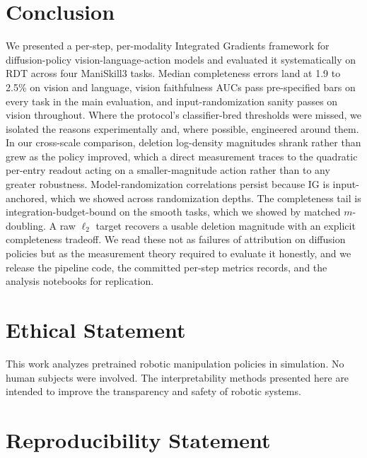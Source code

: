 \documentclass{article}
\begin{document}
\section{Conclusion}

We presented a per-step, per-modality Integrated Gradients framework for diffusion-policy vision-language-action models and evaluated it systematically on RDT across four ManiSkill3 tasks.
Median completeness errors land at 1.9 to 2.5\% on vision and language, vision faithfulness AUCs pass pre-specified bars on every task in the main evaluation, and input-randomization sanity passes on vision throughout.
Where the protocol's classifier-bred thresholds were missed, we isolated the reasons experimentally and, where possible, engineered around them.
In our cross-scale comparison, deletion log-density magnitudes shrank rather than grew as the policy improved, which a direct measurement traces to the quadratic per-entry readout acting on a smaller-magnitude action rather than to any greater robustness.
Model-randomization correlations persist because IG is input-anchored, which we showed across randomization depths.
The completeness tail is integration-budget-bound on the smooth tasks, which we showed by matched $m$-doubling.
A raw $\ell_2$ target recovers a usable deletion magnitude with an explicit completeness tradeoff.
We read these not as failures of attribution on diffusion policies but as the measurement theory required to evaluate it honestly, and we release the pipeline code, the committed per-step metrics records, and the analysis notebooks for replication.

\section*{Ethical Statement}

This work analyzes pretrained robotic manipulation policies in simulation.
No human subjects were involved.
The interpretability methods presented here are intended to improve the transparency and safety of robotic systems.

\section*{Reproducibility Statement}
\end{document}
